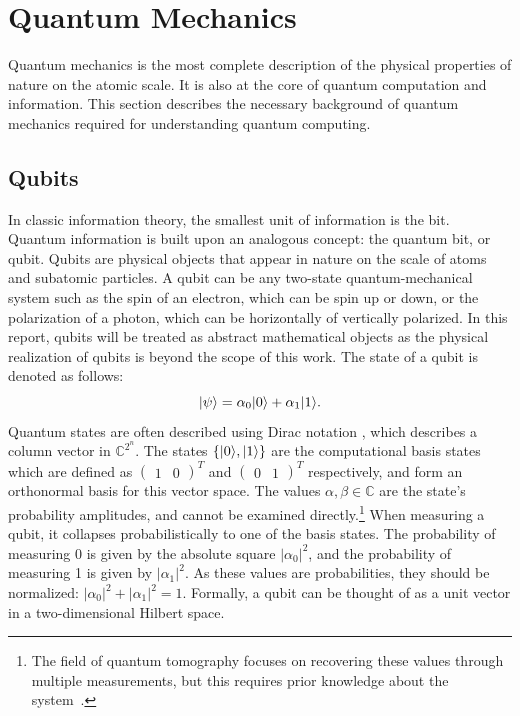\section{Quantum Mechanics}
Quantum mechanics is the most complete description of the physical properties of nature on the atomic scale.
It is also at the core of quantum computation and information.
This section describes the necessary background of quantum mechanics required for understanding quantum computing.

\subsection{Qubits} \label{sec:quantum-states}
In classic information theory, the smallest unit of information is the bit.
Quantum information is built upon an analogous concept: the quantum bit, or qubit.
Qubits are physical objects that appear in nature on the scale of atoms and subatomic particles.
A qubit can be any two-state quantum-mechanical system such as the spin of an electron, which can be spin up or down, or the polarization of a photon, which can be horizontally of vertically polarized.
In this report, qubits will be treated as abstract mathematical objects as the physical realization of qubits is beyond the scope of this work.
The state of a qubit is denoted as follows:
\begin{equation} \label{eqn:qubit-state}
\vert{\psi}\rangle = \alpha_0\vert{0}\rangle + \alpha_1\vert{1}\rangle.
\end{equation}
Quantum states are often described using Dirac notation \ket{\,\cdotp\,}, which describes a column vector in $\mathbb{C}^{2^n}$.
The states $\{\vert{0}\rangle, \vert{1}\rangle\}$ are the computational basis states which are defined as $(\begin{matrix}1 & 0\end{matrix})^T$ and $(\begin{matrix}0 & 1\end{matrix})^T$ respectively, and form an orthonormal basis for this vector space.
The values $\alpha, \beta \in \mathbb{C}$ are the state's probability amplitudes, and cannot be examined directly.\footnote{The field of quantum tomography focuses on recovering these values through multiple measurements, but this requires prior knowledge about the system~\cite{d2003quantum}.}
When measuring a qubit, it collapses probabilistically to one of the basis states.
The probability of measuring 0 is given by the absolute square $|\alpha_0|^2$, and the probability of measuring 1 is given by $|\alpha_1|^2$.
As these values are probabilities, they should be normalized: $|\alpha_0|^2 + |\alpha_1|^2 = 1$.
Formally, a qubit can be thought of as a unit vector in a two-dimensional Hilbert space.

